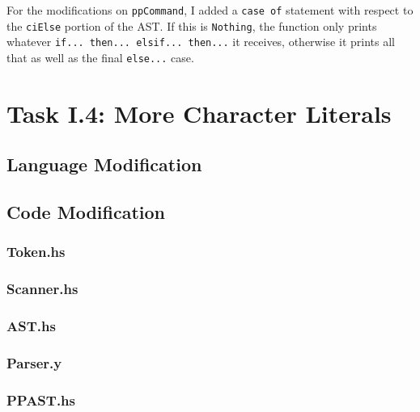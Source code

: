 \documentclass[12pt]{article}
\newcommand{\lstin}[3]{%
  
}
\begin{document}
For the modifications on \verb|ppCommand|, I added a \verb|case of| statement with respect to the \verb|ciElse| portion of the AST. 
If this is \verb|Nothing|, the function only prints whatever \verb|if... then... elsif... then...| it receives, otherwise it prints all that as well as the final \verb|else...| case.

\lstin{54}{64}{PPAST.hs}

\section{Task I.4: More Character Literals}
\subsection{Language Modification}

\subsection{Code Modification}
\subsubsection{Token.hs}
\subsubsection{Scanner.hs}
\subsubsection{AST.hs}
\subsubsection{Parser.y}
\subsubsection{PPAST.hs}
\end{document}
